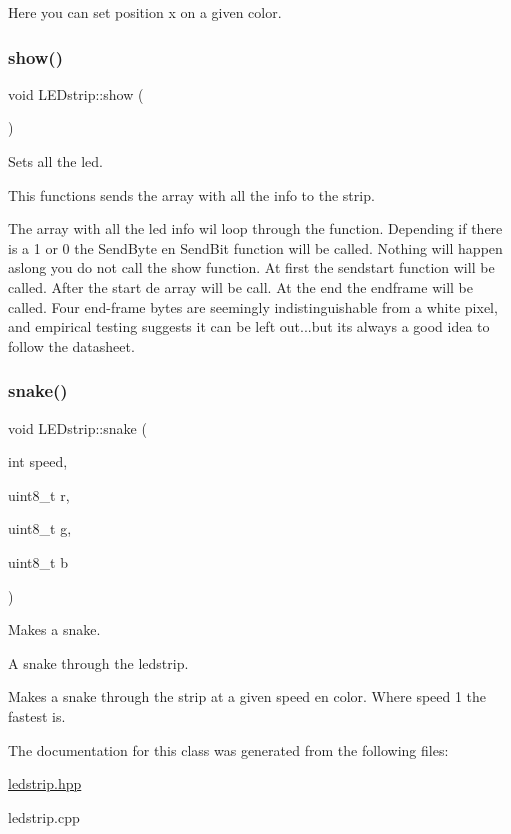Here you can set position x on a given color. \mbox{\label{class_l_e_dstrip_a026a5cfb93b103b23764b1eaa957fe3c}} 
\subsubsection{\texorpdfstring{show()}{show()}}
{\footnotesize\ttfamily void L\+E\+Dstrip\+::show (\begin{DoxyParamCaption}{ }\end{DoxyParamCaption})}



Sets all the led. 

This functions sends the array with all the info to the strip.

The array with all the led info wil loop through the function. Depending if there is a 1 or 0 the Send\+Byte en Send\+Bit function will be called. Nothing will happen aslong you do not call the show function. At first the sendstart function will be called. After the start de array will be call. At the end the endframe will be called. Four end-\/frame bytes are seemingly indistinguishable from a white pixel, and empirical testing suggests it can be left out...but it\textquotesingle{}s always a good idea to follow the datasheet. \mbox{\label{class_l_e_dstrip_a21a402a28f249ad5eba81712d3498af6}} 
\subsubsection{\texorpdfstring{snake()}{snake()}}
{\footnotesize\ttfamily void L\+E\+Dstrip\+::snake (\begin{DoxyParamCaption}\item[{int}]{speed,  }\item[{uint8\+\_\+t}]{r,  }\item[{uint8\+\_\+t}]{g,  }\item[{uint8\+\_\+t}]{b }\end{DoxyParamCaption})}



Makes a snake. 

A snake through the ledstrip.

Makes a snake through the strip at a given speed en color. Where speed 1 the fastest is. 

The documentation for this class was generated from the following files\+:\begin{DoxyCompactItemize}
\item 
\hyperlink{ledstrip_8hpp}{ledstrip.\+hpp}\item 
ledstrip.\+cpp\end{DoxyCompactItemize}
